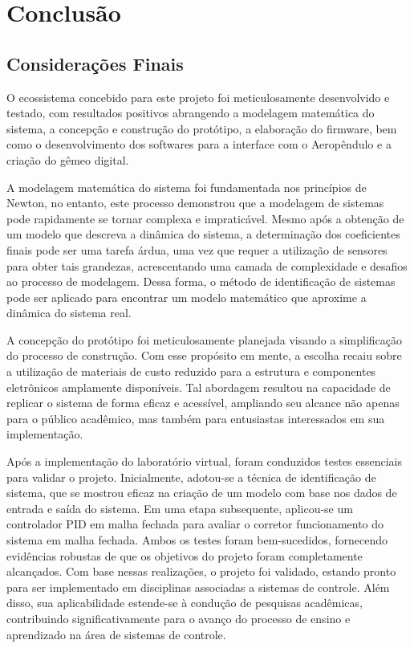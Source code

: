 \chapter{Conclusão}
\label{cap_conclusao}

\section{Considerações Finais}
\label{concideracoes_finais}

O ecossistema concebido para este projeto foi meticulosamente desenvolvido e testado, com resultados positivos abrangendo a modelagem matemática do sistema, a concepção e construção do protótipo, a elaboração do firmware, bem como o desenvolvimento dos softwares para a interface com o Aeropêndulo e a criação do gêmeo digital.

A modelagem matemática do sistema foi fundamentada nos princípios de Newton, no entanto, este processo demonstrou que a modelagem de sistemas pode rapidamente se tornar complexa e impraticável. Mesmo após a obtenção de um modelo que descreva a dinâmica do sistema, a determinação dos coeficientes finais pode ser uma tarefa árdua, uma vez que requer a utilização de sensores para obter tais grandezas, acrescentando uma camada de complexidade e desafios ao processo de modelagem. Dessa forma, o método de identificação de sistemas pode ser aplicado para encontrar um modelo matemático que aproxime a dinâmica do sistema real.


A concepção do protótipo foi meticulosamente planejada visando a simplificação do processo de construção. Com esse propósito em mente, a escolha recaiu sobre a utilização de materiais de custo reduzido para a estrutura e componentes eletrônicos amplamente disponíveis. Tal abordagem resultou na capacidade de replicar o sistema de forma eficaz e acessível, ampliando seu alcance não apenas para o público acadêmico, mas também para entusiastas interessados em sua implementação.


Após a implementação do laboratório virtual, foram conduzidos testes essenciais para validar o projeto. Inicialmente, adotou-se a técnica de identificação de sistema, que se mostrou eficaz na criação de um modelo com base nos dados de entrada e saída do sistema. Em uma etapa subsequente, aplicou-se um controlador PID em malha fechada para avaliar o corretor funcionamento do sistema em malha fechada. Ambos os testes foram bem-sucedidos, fornecendo evidências robustas de que os objetivos do projeto foram completamente alcançados. Com base nessas realizações, o projeto foi validado, estando pronto para ser implementado em disciplinas associadas a sistemas de controle. Além disso, sua aplicabilidade estende-se à condução de pesquisas acadêmicas, contribuindo significativamente para o avanço do processo de ensino e aprendizado na área de sistemas de controle.

